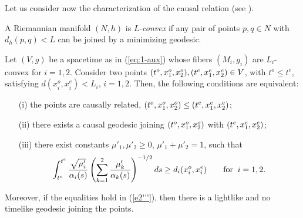 Let us consider now the characterization of the causal relation (see \cite[Theorem 2(2)]{FS}).
 \begin{defi}
A Riemannian manifold $(N,h)$ is $L$-{\em convex} if any pair of points $p,q\in N$ with $d_h(p,q)<L$ can be joined by a minimizing geodesic.
\end{defi}
\begin{prop}
\label{p2'}
Let $(V,g)$ be a {\multiwarped} spacetime as in (\ref{eq:1-aux}) whose fibers $(M_i,g_i)$ are $L_i$-convex for $i=1,2$. Consider two points $(t^{o},x^o_{1},x^o_2), (t^{e},x_1^{e},x_2^e) \in V$, with $t^o \leq t^e$, satisfying $d(x_i^o,x_i^e)<L_i$, $i=1,2$. Then, the following conditions are equivalent:
\begin{itemize}
\item[(i)] the points are causally related,
$(t^{o},x_1^{o},x_2^o) \leq (t^{e},x_1^{e},x_2^e)$;

\item[(ii)] there exists a causal geodesic joining $(t^{o},x_1^{o},x_2^o)$ with $(t^{e},x_1^{e},x_2^e)$;

\item[(iii)] there exist constants $\mu'_{1},\mu'_{2}\geq 0$, $\mu'_1+\mu'_2=1$,
such that
\begin{equation}
\label{e2'''}
\int_{t^{o}}^{t^{e}} \frac{\sqrt{\mu'_{i}}}{\alpha_{i}(s)}\left(\sum_{k=1}^{2} \frac{\mu'_{k}}{\alpha_{k}(s)} \right)^{-1/2}ds \geq
d_{i}(x^{o}_{i},x^{e}_{i})\qquad\hbox{for}\;\;
i=1,2.
\end{equation}
\end{itemize}
Moreover, if the equalities hold in (\ref{e2'''}), then there is a lightlike and no timelike geodesic joining the points.
\end{prop}

